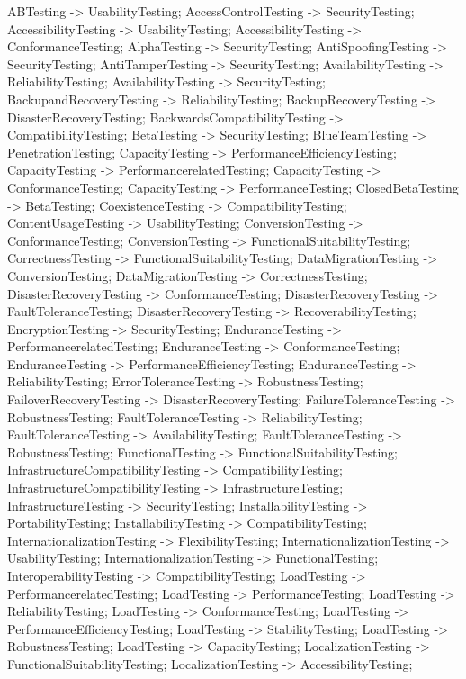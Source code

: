 \documentclass{article}
\begin{document}
{ABTesting -> UsabilityTesting;
AccessControlTesting -> SecurityTesting;
AccessibilityTesting -> UsabilityTesting;
AccessibilityTesting -> ConformanceTesting;
AlphaTesting -> SecurityTesting;
AntiSpoofingTesting -> SecurityTesting;
AntiTamperTesting -> SecurityTesting;
AvailabilityTesting -> ReliabilityTesting;
AvailabilityTesting -> SecurityTesting;
BackupandRecoveryTesting -> ReliabilityTesting;
BackupRecoveryTesting -> DisasterRecoveryTesting;
BackwardsCompatibilityTesting -> CompatibilityTesting;
BetaTesting -> SecurityTesting;
BlueTeamTesting -> PenetrationTesting;
CapacityTesting -> PerformanceEfficiencyTesting;
CapacityTesting -> PerformancerelatedTesting;
CapacityTesting -> ConformanceTesting;
CapacityTesting -> PerformanceTesting;
ClosedBetaTesting -> BetaTesting;
CoexistenceTesting -> CompatibilityTesting;
ContentUsageTesting -> UsabilityTesting;
ConversionTesting -> ConformanceTesting;
ConversionTesting -> FunctionalSuitabilityTesting;
CorrectnessTesting -> FunctionalSuitabilityTesting;
DataMigrationTesting -> ConversionTesting;
DataMigrationTesting -> CorrectnessTesting;
DisasterRecoveryTesting -> ConformanceTesting;
DisasterRecoveryTesting -> FaultToleranceTesting;
DisasterRecoveryTesting -> RecoverabilityTesting;
EncryptionTesting -> SecurityTesting;
EnduranceTesting -> PerformancerelatedTesting;
EnduranceTesting -> ConformanceTesting;
EnduranceTesting -> PerformanceEfficiencyTesting;
EnduranceTesting -> ReliabilityTesting;
ErrorToleranceTesting -> RobustnessTesting;
FailoverRecoveryTesting -> DisasterRecoveryTesting;
FailureToleranceTesting -> RobustnessTesting;
FaultToleranceTesting -> ReliabilityTesting;
FaultToleranceTesting -> AvailabilityTesting;
FaultToleranceTesting -> RobustnessTesting;
FunctionalTesting -> FunctionalSuitabilityTesting;
InfrastructureCompatibilityTesting -> CompatibilityTesting;
InfrastructureCompatibilityTesting -> InfrastructureTesting;
InfrastructureTesting -> SecurityTesting;
InstallabilityTesting -> PortabilityTesting;
InstallabilityTesting -> CompatibilityTesting;
InternationalizationTesting -> FlexibilityTesting;
InternationalizationTesting -> UsabilityTesting;
InternationalizationTesting -> FunctionalTesting;
InteroperabilityTesting -> CompatibilityTesting;
LoadTesting -> PerformancerelatedTesting;
LoadTesting -> PerformanceTesting;
LoadTesting -> ReliabilityTesting;
LoadTesting -> ConformanceTesting;
LoadTesting -> PerformanceEfficiencyTesting;
LoadTesting -> StabilityTesting;
LoadTesting -> RobustnessTesting;
LoadTesting -> CapacityTesting;
LocalizationTesting -> FunctionalSuitabilityTesting;
LocalizationTesting -> AccessibilityTesting;
}
\end{document}
